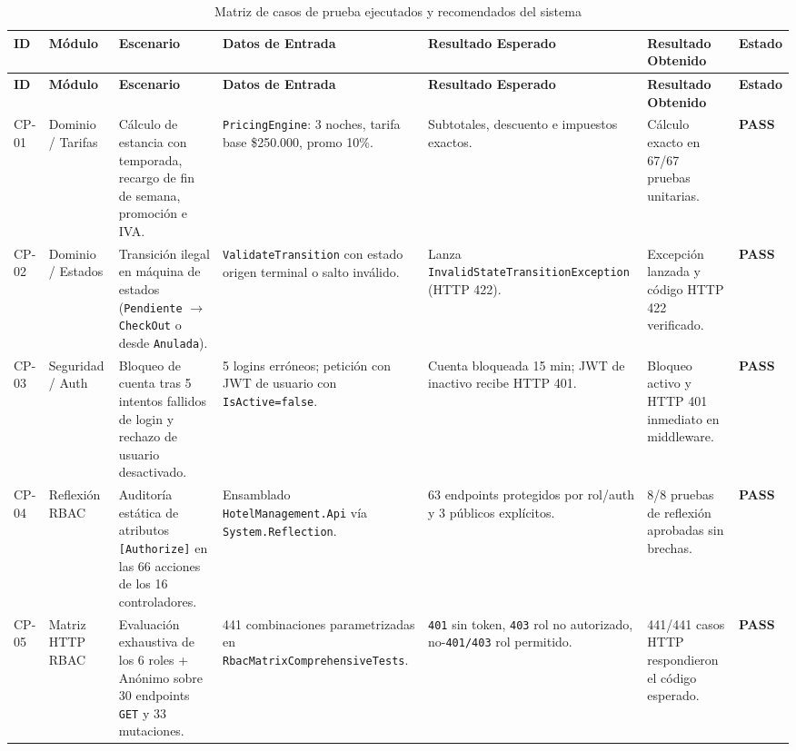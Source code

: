 \documentclass[12pt,a4paper]{article}
\begin{document}
\begin{longtable}{p{1.3cm} p{2.1cm} p{3.1cm} p{2.6cm} p{2.0cm} p{2.0cm} p{1.3cm}}
\caption{Matriz de casos de prueba ejecutados y recomendados del sistema}
\label{tab:matriz_pruebas}\\
\toprule
\textbf{ID} & \textbf{M\'odulo} & \textbf{Escenario} & \textbf{Datos de Entrada} & \textbf{Resultado Esperado} & \textbf{Resultado Obtenido} & \textbf{Estado}\\
\midrule
\endfirsthead
\toprule
\textbf{ID} & \textbf{M\'odulo} & \textbf{Escenario} & \textbf{Datos de Entrada} & \textbf{Resultado Esperado} & \textbf{Resultado Obtenido} & \textbf{Estado}\\
\midrule
\endhead
\bottomrule
\endfoot
CP-01 & Dominio / Tarifas & C\'alculo de estancia con temporada, recargo de fin de semana, promoci\'on e IVA. & \texttt{PricingEngine}: 3 noches, tarifa base \$250.000, promo 10\%. & Subtotales, descuento e impuestos exactos. & C\'alculo exacto en 67/67 pruebas unitarias. & \textcolor{verdepass}{\textbf{PASS}}\\[0.12cm]
CP-02 & Dominio / Estados & Transici\'on ilegal en m\'aquina de estados (\texttt{Pendiente} $\rightarrow$ \texttt{CheckOut} o desde \texttt{Anulada}). & \texttt{ValidateTransition} con estado origen terminal o salto inv\'alido. & Lanza \texttt{InvalidStateTransitionException} (HTTP 422). & Excepci\'on lanzada y c\'odigo HTTP 422 verificado. & \textcolor{verdepass}{\textbf{PASS}}\\[0.12cm]
CP-03 & Seguridad / Auth & Bloqueo de cuenta tras 5 intentos fallidos de login y rechazo de usuario desactivado. & 5 logins err\'oneos; petici\'on con JWT de usuario con \texttt{IsActive=false}. & Cuenta bloqueada 15 min; JWT de inactivo recibe HTTP 401. & Bloqueo activo y HTTP 401 inmediato en middleware. & \textcolor{verdepass}{\textbf{PASS}}\\[0.12cm]
CP-04 & Reflexi\'on RBAC & Auditor\'ia est\'atica de atributos \texttt{[Authorize]} en las 66 acciones de los 16 controladores. & Ensamblado \texttt{HotelManagement.Api} v\'ia \texttt{System.Reflection}. & 63 endpoints protegidos por rol/auth y 3 p\'ublicos expl\'icitos. & 8/8 pruebas de reflexi\'on aprobadas sin brechas. & \textcolor{verdepass}{\textbf{PASS}}\\[0.12cm]
CP-05 & Matriz HTTP RBAC & Evaluaci\'on exhaustiva de los 6 roles + An\'onimo sobre 30 endpoints \texttt{GET} y 33 mutaciones. & 441 combinaciones parametrizadas en \texttt{RbacMatrixComprehensiveTests}. & \texttt{401} sin token, \texttt{403} rol no autorizado, no-\texttt{401/403} rol permitido. & 441/441 casos HTTP respondieron el c\'odigo esperado. & \textcolor{verdepass}{\textbf{PASS}}\\[0.12cm]

\end{longtable}
\end{document}
